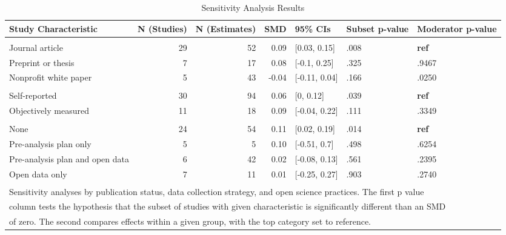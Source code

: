 \documentclass[sn-nature,referee,pdflatex]{sn-jnl}
\begin{document}
\begin{table}[!h]
\centering
\caption{\label{tab:table_three}Sensitivity Analysis Results}
\centering
\begin{tabular}[t]{lrrrlll}
\toprule
Study Characteristic & N (Studies) & N (Estimates) & SMD & 95\% CIs & Subset p-value & Moderator p-value\\
\midrule
\addlinespace[0.3em]
\multicolumn{7}{l}{\textbf{Publication Status}}\\
\hspace{1em}Journal article & 29 & 52 & 0.09 & {}[0.03, 0.15] & .008 & \textbf{ref}\\
\hspace{1em}Preprint or thesis & 7 & 17 & 0.08 & {}[-0.1, 0.25] & .325 & .9467\\
\hspace{1em}Nonprofit white paper & 5 & 43 & -0.04 & {}[-0.11, 0.04] & .166 & .0250\\
\addlinespace[0.3em]
\multicolumn{7}{l}{\textbf{Data Collection Strategy}}\\
\hspace{1em}Self-reported & 30 & 94 & 0.06 & {}[0, 0.12] & .039 & \textbf{ref}\\
\hspace{1em}Objectively measured & 11 & 18 & 0.09 & {}[-0.04, 0.22] & .111 & .3349\\
\addlinespace[0.3em]
\multicolumn{7}{l}{\textbf{Open Science}}\\
\hspace{1em}None & 24 & 54 & 0.11 & {}[0.02, 0.19] & .014 & \textbf{ref}\\
\hspace{1em}Pre-analysis plan only & 5 & 5 & 0.10 & {}[-0.51, 0.7] & .498 & .6254\\
\hspace{1em}Pre-analysis plan and open data & 6 & 42 & 0.02 & {}[-0.08, 0.13] & .561 & .2395\\
\hspace{1em}Open data only & 7 & 11 & 0.01 & {}[-0.25, 0.27] & .903 & .2740\\
\bottomrule
\multicolumn{7}{l}{\textsuperscript{} Sensitivity analyses by publication status, data collection strategy, and open science practices. The first p value}\\
\multicolumn{7}{l}{column tests the hypothesis that the subset of studies with given characteristic is significantly different than an SMD}\\
\multicolumn{7}{l}{of zero. The second compares effects within a given group, with the top category set to reference.}\\
\end{tabular}
\end{table}
\end{document}

